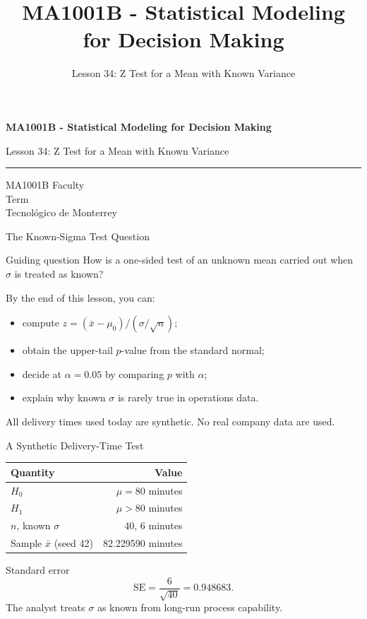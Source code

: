 \documentclass[aspectratio=169,10pt,english]{beamer}
\title{MA1001B - Statistical Modeling for Decision Making}
\subtitle{Lesson 34: Z Test for a Mean with Known Variance}
\author{}
\institute{Tecnol\'ogico de Monterrey}
\date{}
\begin{document}
\begin{frame}[plain]
  \vspace{1.2cm}
  {\Large\bfseries MA1001B - Statistical Modeling for Decision Making\par}
  \vspace{0.7cm}
  {\large Lesson 34: Z Test for a Mean with Known Variance\par}
  \vspace{0.7cm}
  {\color{TecRojo}\rule{\textwidth}{1.2pt}}
  \vspace{0.8cm}

  MA1001B Faculty\\[0.3cm]
  Term\\[0.3cm]
  Tecnol\'ogico de Monterrey
\end{frame}

\begin{frame}{The Known-Sigma Test Question}
  \begin{alertblock}{Guiding question}
    How is a one-sided test of an unknown mean carried out when $\sigma$ is
    treated as known?
  \end{alertblock}

  \vspace{0.6em}
  By the end of this lesson, you can:
  \begin{itemize}
    \item compute $z=(\bar{x}-\mu_{0})/(\sigma/\sqrt{n})$;
    \item obtain the upper-tail $p$-value from the standard normal;
    \item decide at $\alpha=0.05$ by comparing $p$ with $\alpha$;
    \item explain why known $\sigma$ is rarely true in operations data.
  \end{itemize}

  \vfill
  \scriptsize All delivery times used today are synthetic. No real company data are used.
\end{frame}

\begin{frame}{A Synthetic Delivery-Time Test}
  \small
  \begin{center}
    \begin{tabular}{lr}
      \toprule
      \textbf{Quantity} & \textbf{Value} \\
      \midrule
      $H_{0}$ & $\mu=80$ minutes \\
      $H_{1}$ & $\mu>80$ minutes \\
      $n$, known $\sigma$ & 40, 6 minutes \\
      Sample $\bar{x}$ (seed 42) & 82.229590 minutes \\
      \bottomrule
    \end{tabular}
  \end{center}

  \vspace{0.5em}
  \begin{exampleblock}{Standard error}
    \[
      \mathrm{SE}=\frac{6}{\sqrt{40}}=0.948683.
    \]
    The analyst treats $\sigma$ as known from long-run process capability.
  \end{exampleblock}
\end{frame}
\end{document}
